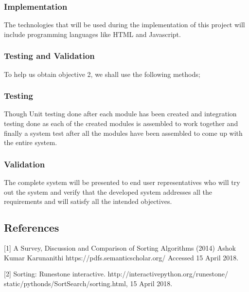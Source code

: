 \documentclass{article}
\begin{document}
\subsubsection{Implementation}
The technologies that will be used during the implementation of this project will include programming languages like HTML and Javascript.

\subsubsection{Testing and Validation}

To help us obtain objective 2, we shall use the following methods;
\subsubsection{Testing}
Though Unit testing done after each module has been created and integration testing done as each of the created modules is assembled to work together and finally a system test after all the modules have been assembled to come up with the entire system.   

\subsubsection{Validation}
The complete system will be presented to end user representatives who will try out the system and verify that the developed system addresses all the requirements and will satisfy all the intended objectives.

\subsection{References}
[1] A Survey, Discussion and Comparison of Sorting Algorithms (2014) Ashok Kumar Karunanithi  https://pdfs.semanticscholar.org/ Accessed 15 April 2018.

[2] Sorting: Runestone interactive. http://interactivepython.org/runestone/
static/pythonds/SortSearch/sorting.html, 15 April 2018.
		
\end{document}
